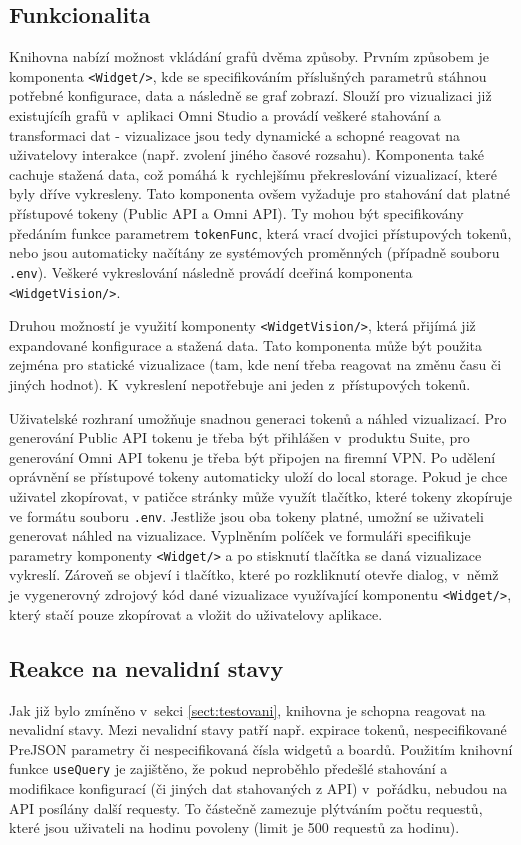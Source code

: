\documentclass[czech, bc, kiv, he, iso690numb, viewonly]{fasthesis} %
\begin{document}
\subsection{Funkcionalita}
Knihovna nabízí možnost vkládání grafů dvěma způsoby. Prvním způsobem je komponenta \texttt{<Widget/>}, kde se specifikováním příslušných parametrů stáhnou potřebné konfigurace, data
a následně se graf zobrazí. Slouží pro vizualizaci již existujícíh grafů v~aplikaci Omni Studio a provádí veškeré stahování a transformaci dat - vizualizace jsou tedy dynamické
a schopné reagovat na uživatelovy interakce (např. zvolení jiného časové rozsahu). Komponenta také cachuje stažená data, což pomáhá k~rychlejšímu překreslování vizualizací,
které byly dříve vykresleny. Tato komponenta ovšem vyžaduje pro stahování dat platné přístupové tokeny (Public API a Omni API). Ty mohou být specifikovány
předáním funkce parametrem \texttt{tokenFunc}, která vrací dvojici přístupových tokenů, nebo jsou automaticky načítány ze systémových proměnných (případně souboru \texttt{.env}). Veškeré
vykreslování následně provádí dceřiná komponenta \texttt{<WidgetVision/>}.

Druhou možností je využití komponenty \texttt{<WidgetVision/>}, která přijímá již expandované konfigurace a stažená data. Tato komponenta může být použita
zejména pro statické vizualizace (tam, kde není třeba reagovat na změnu času či jiných hodnot). K~vykreslení nepotřebuje ani jeden z~přístupových tokenů. 

Uživatelské rozhraní umožňuje snadnou generaci tokenů a náhled vizualizací. Pro generování Public API tokenu je třeba být přihlášen v~produktu Suite, pro
generování Omni API tokenu je třeba být připojen na firemní VPN. Po udělení oprávnění se přístupové tokeny automaticky uloží do local storage. Pokud je chce uživatel zkopírovat,
v patičce stránky může využít tlačítko, které tokeny zkopíruje ve formátu souboru \texttt{.env}. Jestliže jsou oba tokeny platné, umožní se uživateli generovat náhled na vizualizace.
Vyplněním políček ve formuláři specifikuje parametry komponenty \texttt{<Widget/>} a po stisknutí tlačítka se daná vizualizace vykreslí. Zároveň se objeví i tlačítko, které po rozkliknutí
otevře dialog, v~němž je vygenerovný zdrojový kód dané vizualizace využívající komponentu \texttt{<Widget/>}, který stačí pouze zkopírovat a vložit do uživatelovy aplikace.

\subsection{Reakce na nevalidní stavy}
Jak již bylo zmíněno v~sekci \ref{sect:testovani}, knihovna je schopna reagovat na nevalidní stavy. Mezi nevalidní stavy patří např. expirace tokenů,
nespecifikované PreJSON parametry či nespecifikovaná čísla widgetů a boardů. Použitím knihovní funkce \texttt{useQuery} je zajištěno, že pokud neproběhlo předešlé stahování
a modifikace konfigurací (či jiných dat stahovaných z API) v~pořádku, nebudou na API posílány další requesty. To částečně zamezuje plýtváním počtu requestů, které jsou uživateli
na hodinu povoleny (limit je 500 requestů za hodinu).
\end{document}
